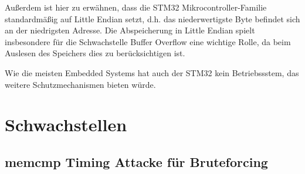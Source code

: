 \documentclass[a4paper,
DIV=13,
12pt,
BCOR=10mm,
department=FakIM,
oneside,
parskip=half,
automark,
listof=totocnumbered,
bibliography=totocnumbered,
acronym=totocnumbered
] {OTHRartcl}
\begin{document}

Außerdem ist hier zu erwähnen, dass die STM32 Mikrocontroller-Familie standardmäßig auf Little Endian setzt, d.h. das niederwertigste Byte befindet sich an der niedrigsten Adresse.
Die Abspeicherung in Little Endian spielt insbesondere für die Schwachstelle Buffer Overflow eine wichtige Rolle, da beim Auslesen des
Speichers dies zu berücksichtigen ist.

Wie die meisten Embedded Systems hat auch der STM32 kein Betriebssstem, das weitere Schutzmechanismen bieten würde.


\section{Schwachstellen}
\subsection{memcmp Timing Attacke für Bruteforcing}
\end{document}
